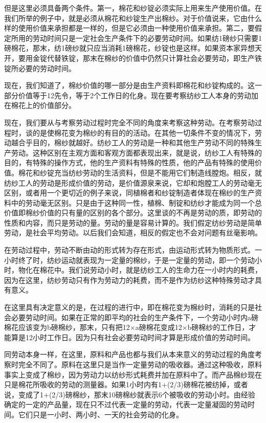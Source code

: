 \documentclass{ctexbook}
\begin{document}
    但是这里必须具备两个条件。第一，棉花和纱锭必须实际上用来生产使用价值。在我们所举的例子中，就是必须从棉花和纱锭生产出棉纱。对于价值说来，它由什么样的使用价值来承担都是一样的，但是它必须由一种使用价值来承担。第二，要假定所用的劳动时间只是一定社会生产条件下的必要劳动时间。如果纺1磅纱只需要1磅棉花，那末，纺1磅纱就只应当消耗1磅棉花，纱锭也是这样。如果资本家异想天开，要用金锭代替铁锭，那末在棉纱的价值中仍然只计算社会必要劳动，即生产铁锭所必要的劳动时间。
    
    现在，我们知道了，棉纱价值的哪一部分是由生产资料即棉花和纱锭构成的。这一部分价值等于12先令，等于2个工作日的化身。现在要考察纺纱工人本身的劳动加在棉花上的价值部分。
    
    现在，我们要从与考察劳动过程时完全不同的角度来考察这种劳动。在考察劳动过程时，谈的是使棉花变为棉纱的有目的的活动。在其他一切条件不变的情况下，劳动越合乎目的，棉纱就越好。纺纱工人的劳动是一种和其他生产劳动不同的特殊生产劳动。这种区别在主观方面和客观方面都表现出来，就是说，纺纱工人有特殊的目的，有特殊的操作方式，他的生产资料有特殊的性质，他的产品有特殊的使用价值。棉花和纱锭充当纺纱劳动的生活资料，但是不能用它们制造线膛炮。相反，就纺纱工人的劳动是形成价值的劳动，是价值源泉来说，它却和炮膛工人的劳动毫无区别，或者用一个更切近的例子来说，同植棉者和纱锭制造者体现在棉纱的生产资料中的劳动毫无区别。只是由于这种同一性，植棉、制锭和纺纱才能成为同一个总价值即棉纱价值的只有量的区别的各个部分。这里谈的不再是劳动的质，即劳动的性质和内容，而只是劳动的量。劳动的量是容易计算的。我们假定纺纱劳动是简单劳动，是社会平均劳动。以后我们会知道，相反的假定也不会对问题有丝毫影响。
    
    在劳动过程中，劳动不断由动的形式转为存在形式，由运动形式转为物质形式。一小时终了时，纺纱运动就表现为一定量的棉纱，于是一定量的劳动，即一个劳动小时，物化在棉花中。我们说劳动小时，就是纺纱工人的生命力在一小时内的耗费，因为在这里，纺纱劳动只有作为劳动力的耗费，而不是作为纺纱这种特殊劳动才具有意义。
    
    在这里具有决定意义的是，在过程的进行中，即在棉花变为棉纱时，消耗的只是社会必要劳动时间。如果在正常的即平均的社会的生产条件下，一个劳动小时内a磅棉花应该变为b磅棉纱，那末，只有把12×a磅棉花变成12×b磅棉纱的工作日，才能算是12小时工作日。因为只有社会必要劳动时间才算是形成价值的劳动时间。
    
    同劳动本身一样，在这里，原料和产品也都与我们从本来意义的劳动过程的角度考察时完全不同了。原料在这里只是当作一定量劳动的吸收器。通过这种吸收，原料事实上变成了棉纱，因为劳动力以纺纱形式耗费并加在原料中了。而产品棉纱现在只是棉花所吸收的劳动的测量器。如果1小时内有1+(2/3)磅棉花被纺掉，或者说，变成了1+(2/3)磅棉纱，那末10磅棉纱就表示6个被吸收的劳动小时。由经验确定的一定的产品量，现在只不过代表一定量的劳动，代表一定量凝固的劳动时间。它们只是一小时、两小时、一天的社会劳动的化身。
    
\end{document}

